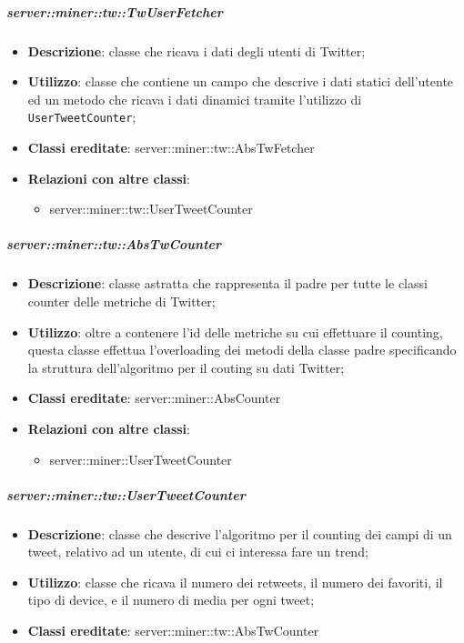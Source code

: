 	\subparagraph{server::miner::tw::TwUserFetcher} %
		\label{subp:server_miner_tw_TwUserFetcher}
			\begin{itemize}
				\item \textbf{Descrizione}: classe che ricava i dati degli utenti di Twitter;
				\item \textbf{Utilizzo}: classe che contiene un campo che descrive i dati statici dell'utente ed un metodo che ricava i dati dinamici tramite l'utilizzo di \texttt{UserTweetCounter};
				\item \textbf{Classi ereditate}: server::miner::tw::AbsTwFetcher
				\item \textbf{Relazioni con altre classi}:
					\begin{itemize}
						\item server::miner::tw::UserTweetCounter
					\end{itemize}
			\end{itemize}

	\subparagraph{server::miner::tw::AbsTwCounter} %
		\label{subp:server_miner_tw_AbsTwCounter}
			\begin{itemize}
				\item \textbf{Descrizione}: classe astratta che rappresenta il padre per tutte le classi counter delle metriche di Twitter;
				\item \textbf{Utilizzo}: oltre a contenere l’id delle metriche su cui effettuare il counting, questa classe effettua l'overloading dei metodi della classe padre specificando la struttura dell'algoritmo per il couting su dati Twitter;
				\item \textbf{Classi ereditate}: server::miner::AbsCounter
				\item \textbf{Relazioni con altre classi}:
					\begin{itemize}
						\item server::miner::UserTweetCounter
					\end{itemize}
			\end{itemize}

	\subparagraph{server::miner::tw::UserTweetCounter} %
		\label{subp:server_miner_tw_UserTweetCounter}
			\begin{itemize}
				\item \textbf{Descrizione}: classe che descrive l'algoritmo per il counting dei campi di un tweet, relativo ad un utente, di cui ci interessa fare un trend;
				\item \textbf{Utilizzo}: classe che ricava il numero dei retweets, il numero dei favoriti, il tipo di device, e il numero di media per ogni tweet;
				\item \textbf{Classi ereditate}: server::miner::tw::AbsTwCounter
			\end{itemize}


